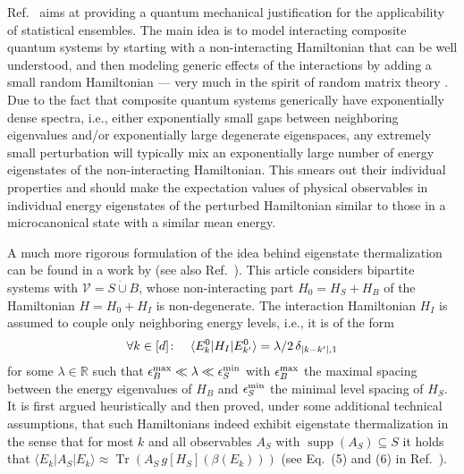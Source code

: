 \documentclass[a4paper,12pt,listof=totoc,index=totoc,bibliography=totoc,headsepline=false,headings=normal,BCOR16.153846mm,DIV12,headinclude,twoside,cleardoublepage=empty,numbers=noenddot,final]{scrreprt}
\theoremstyle{mystyle}
\numberwithin{equation}{section}
\numberwithin{figure}{section}
\numberwithin{lemma}{section}
\numberwithin{theorem}{section}
\numberwithin{corollary}{section}
\numberwithin{definition}{section}
\numberwithin{conjecture}{section}
\numberwithin{observation}{section}
\newcommand{\+}{\mkern2mu}
\newcommand{\dunion}{\mathbin{\dot{\cup}}}
\newcommand{\itholds}{\colon\mathchoice{\quad}{}{}{}}
\renewcommand{\max}{\mathchoice{\operatorname*{max}}{\operatorname*{max}}{\mathrm{max}}{\mathrm{max}}} %
\renewcommand{\min}{\mathchoice{\operatorname*{min}}{\operatorname*{min}}{\mathrm{min}}{\mathrm{min}}}
\newcommand{\levelspaceing}{\epsilon}
\renewcommand{\H}{H}
\newcommand{\Vset}{\mathcal{V}}
\newcommand{\bra}[1]{\langle #1|}
\newcommand{\ket}[1]{|#1\rangle}
\DeclareMathOperator{\1}{\mathds{1}}
\DeclareMathOperator{\Tr}{Tr}
\DeclareMathOperator{\supp}{supp}
\newcommand{\mb}[1]{\mathbb{#1}}
\newcommand{\R}{\mb{R}}
\begin{document}
Ref.~\cite{PhysRevE.50.88} aims at providing a quantum mechanical justification for the applicability of statistical ensembles.
The main idea is to model interacting composite quantum systems by starting with a non-interacting Hamiltonian that can be well understood, and then modeling generic effects of the interactions by adding a small random Hamiltonian --- very much in the spirit of random matrix theory \cite{Bohigas1984,Tao2012,mehta90}.
Due to the fact that composite quantum systems generically have exponentially dense spectra, i.e., either exponentially small gaps between neighboring eigenvalues and/or exponentially large degenerate eigenspaces, any extremely small perturbation will typically mix an exponentially large number of energy eigenstates of the non-interacting Hamiltonian.
This smears out their individual properties and should make the expectation values of physical observables in individual energy eigenstates of the perturbed Hamiltonian similar to those in a microcanonical state with a similar mean energy.

A much more rigorous formulation of the idea behind eigenstate thermalization can be found in a work by \textcite{tasaki98} (see also Ref.~\cite{Tasaki97}).
This article considers bipartite systems with $\Vset = S \dunion B$, whose non-interacting part $\H_0 = \H_S + \H_B$ of the Hamiltonian $\H = \H_0 + \H_I$ is non-degenerate.
The interaction Hamiltonian $\H_I$ is assumed to couple only neighboring energy levels, i.e., it is of the form
\begin{equation}
  \forall k\in[d]\itholds \bra{E^0_k} \H_I \ket{E^0_{k'}} = \lambda/2\,\delta_{|k-k'|,1}
\end{equation}
for some $\lambda\in\R$ such that $\levelspaceing^{\max}_B \ll \lambda \ll \levelspaceing^{\min}_S$ with $\levelspaceing^{\max}_B$ the maximal spacing between the energy eigenvalues of $\H_B$ and $\levelspaceing^{\min}_S$ the minimal level spacing of $\H_S$.
It is first argued heuristically and then proved, under some additional technical assumptions, that such Hamiltonians indeed exhibit eigenstate thermalization in the sense that for most $k$ and all observables $A_S$ with $\supp(A_S) \subseteq S$ it holds that $\bra{E_k} A_S \ket{E_k} \approx \Tr(A_S\, g[H_S](\beta(E_k)))$ (see Eq.~(5) and (6) in Ref.~\cite{Tasaki97}).
\end{document}
